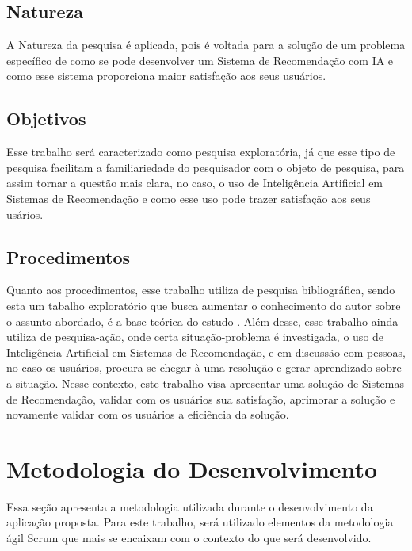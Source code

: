 \subsection{Natureza}\label{subsec:nat}

A Natureza da pesquisa é aplicada, pois é voltada para a solução de um problema específico de como se pode desenvolver um Sistema
de Recomendação com IA e como esse sistema proporciona maior satisfação aos seus usuários. 

\subsection{Objetivos}\label{subsec:obj}

Esse trabalho será caracterizado como pesquisa exploratória, já que esse tipo de pesquisa facilitam a familiariedade do pesquisador com o objeto de 
pesquisa, para assim tornar a questão mais clara, no caso, o uso de Inteligência Artificial em Sistemas de Recomendação e como
esse uso pode trazer satisfação aos seus usários. 

\subsection{Procedimentos}\label{subsec:proced}

Quanto aos procedimentos, esse trabalho utiliza de pesquisa bibliográfica, sendo esta um tabalho exploratório que busca
aumentar o conhecimento do autor sobre o assunto abordado, é a base teórica do estudo \cite{nascimento2016classificaccao}.
Além desse, esse trabalho ainda utiliza de pesquisa-ação, onde certa situação-problema é investigada, o uso de Inteligência Artificial
em Sistemas de Recomendação, e em discussão com pessoas, no caso os usuários, procura-se chegar à uma resolução e gerar aprendizado
sobre a situação. Nesse contexto, este trabalho visa apresentar uma solução de Sistemas de Recomendação, validar com os usuários
sua satisfação, aprimorar a solução e novamente validar com os usuários a eficiência da solução.

\section{Metodologia do Desenvolvimento}\label{sec:metdev}

Essa seção apresenta a metodologia utilizada durante o desenvolvimento da aplicação proposta. Para este trabalho, será utilizado
elementos da metodologia ágil Scrum que mais se encaixam com o contexto do que será desenvolvido.

